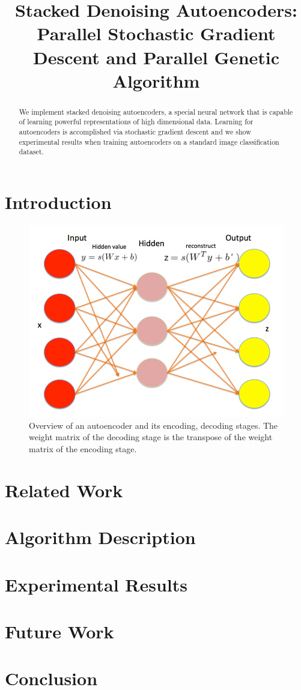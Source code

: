 \documentclass[conference,onecolumn]{IEEEtran}
\begin{document}
\title{Stacked Denoising Autoencoders: Parallel Stochastic Gradient Descent and Parallel Genetic Algorithm}

\author{
\and
{}
}

\maketitle

\begin{abstract}
We implement stacked denoising autoencoders, a special neural network that is capable of learning powerful representations of high dimensional data. Learning for autoencoders is accomplished via stochastic gradient descent and we show experimental results when training autoencoders on a standard image classification dataset. 
\end{abstract}

\FloatBarrier
\section{Introduction}

\begin{figure}[h]
\centering
\includegraphics[width=0.8\linewidth]{autoencoder.png}
\caption{Overview of an autoencoder and its encoding, decoding stages. The weight matrix of the decoding stage is the transpose of the weight matrix of the encoding stage.}
\label{fig:autoencoder}
\end{figure}
\FloatBarrier
\section{Related Work}


\FloatBarrier
\section{Algorithm Description}

\FloatBarrier

\section{Experimental Results}

\FloatBarrier
\section{Future Work}

\FloatBarrier
\section{Conclusion}

\FloatBarrier



\end{document}

